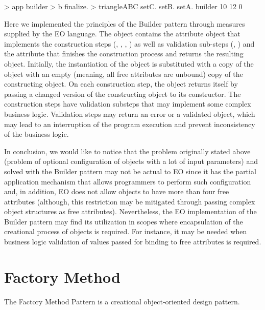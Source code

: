 \documentclass[12pt]{book}
\begin{document}
{{\begin{ffcode}
[args...] > app
  builder > b
  finalize. > triangleABC
    setC.
      setB.
        setA.
          builder
          10
        12
      0

\end{ffcode}


Here we implemented the principles of the Builder pattern through measures supplied by the EO language. The  object contains the  attribute object that implements the construction steps (, , , ) as well as validation sub-steps (, ) and the  attribute that finishes the construction process and returns the resulting object. Initially, the instantiation of the  object is substituted with a copy of the  object with an empty (meaning, all free attributes are unbound) copy of the constructing object. On each construction step, the  object returns itself by passing a changed version of the constructing object to its constructor. The construction steps have validation substeps that may implement some complex business logic. Validation steps may return an error or a validated object, which may lead to an interruption of the program execution and prevent inconsistency of the business logic.

In conclusion, we would like to notice that the problem originally stated above (problem of optional configuration of objects with a lot of input parameters) and solved with the Builder pattern may not be actual to EO since it has the partial application mechanism that allows programmers to perform such configuration and, in addition, EO does not allow objects to have more than four free attributes (although, this restriction may be mitigated through passing complex object structures as free attributes). Nevertheless, the EO implementation of the Builder pattern may find its utilization in scopes where encapsulation of the creational process of objects is required. For instance, it may be needed when business logic validation of values passed for binding to free attributes is required.


\section{Factory Method}
The Factory Method Pattern is a creational object-oriented design pattern.

}}
\end{document}
